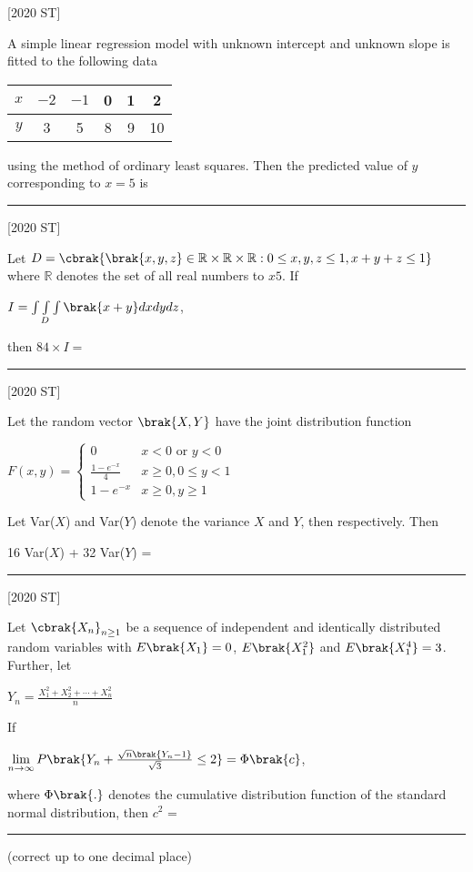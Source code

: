     \hfill [2020 ST]
    \item A simple linear regression model with unknown intercept and unknown slope is fitted to the following data 
    \begin{table}[H]
        \centering
        \begin{tabular}{|c|c|c|c|c|c|}
\hline
   $x$  & $-2$ & $-1$ & 0 & 1 & 2 \\
   \hline
    $y$ & 3 & 5 & 8 & 9 & 10 \\
    \hline
\end{tabular}
    \end{table}
    using the method of ordinary least squares. Then the predicted value of $y$ corresponding to $x = 5$ is \rule{2cm}{0.4pt}

    \hfill [2020 ST]
    \item Let $D = \cbrak{\brak{x,y,z} \in \mathbb{R}\times \mathbb{R}\times \mathbb{R} : 0 \leq x,y,z \leq 1, x + y + z \leq 1}$ where $\mathbb{R}$ denotes the set of all real numbers to $x 5$. If 
    \begin{center}
        $I = \int \int\limits_{ D} \int  \brak{x + y } dx dy dz$,
    \end{center}
    then $84 \times I = $ \rule{2cm}{0.4pt}

    \hfill [2020 ST]
    \item Let the random vector $\brak{X,Y}$ have the joint distribution function 
    \begin{center}
        $F(x,y) = 
        \begin{cases}
            0 & x < 0 \text{ or } y < 0 \\
            \frac{1 - e ^{-x}}{4} & x \geq 0, 0 \leq y < 1 \\
            1 - e^{-x}& x \geq 0, y \geq 1
        \end{cases}$
    \end{center}
    Let Var($X$) and Var($Y$) denote the variance $X$ and $Y$, then respectively. Then 
    \begin{center}
        16 Var($X$) + 32 Var($Y$) = \rule{2cm}{0.4pt}
    \end{center}
    \hfill [2020 ST]
    \item Let $\cbrak{X_n}_{n \geq 1}$ be a sequence of independent and identically distributed random variables with $E\brak{X_1} = 0$, $E\brak{X_1^2}$ and $E\brak{X_1^4} = 3$. Further, let 
\begin{center}
    $Y_n = \frac{X_1^2 + X_2^2 +  \cdots + X_n^2}{n}$
\end{center}
If
\begin{center}
    $\lim \limits_{n \to \infty} P \brak{Y_n + \frac{\sqrt{n}\brak{Y_n - 1}}{\sqrt{3}} \leq 2} = \Phi\brak{c}$,
\end{center}
where $\Phi\brak{.}$ denotes the cumulative distribution function of the standard normal distribution, then $c^2$ = \rule{2cm}{0.4pt}(correct up to one decimal place)


